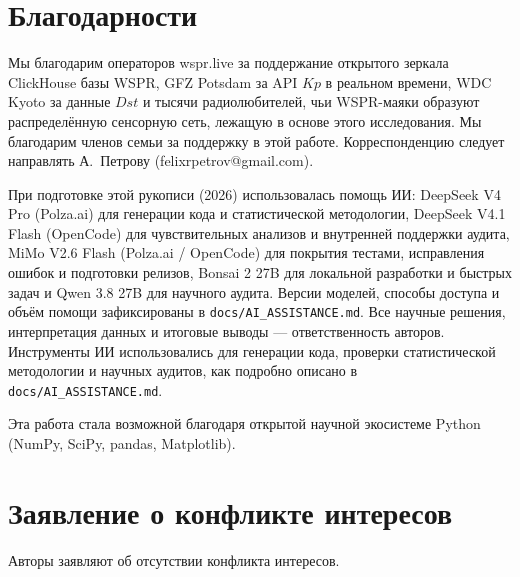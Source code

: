 \documentclass{agujournal2019}
\begin{document}
\section*{Благодарности}

Мы благодарим операторов wspr.live за поддержание открытого зеркала
ClickHouse базы WSPR, GFZ Potsdam за API $Kp$ в реальном времени,
WDC Kyoto за данные $Dst$ и тысячи радиолюбителей, чьи WSPR-маяки
образуют распределённую сенсорную сеть, лежащую в основе этого
исследования. Мы благодарим членов семьи за поддержку в этой работе.
Корреспонденцию следует направлять А.~Петрову (felixrpetrov@gmail.com).

При подготовке этой рукописи (2026) использовалась помощь ИИ:
DeepSeek V4 Pro (Polza.ai) для генерации кода и статистической методологии,
DeepSeek V4.1 Flash (OpenCode) для чувствительных анализов и внутренней
поддержки аудита, MiMo V2.6 Flash (Polza.ai / OpenCode) для покрытия
тестами, исправления ошибок и подготовки релизов, Bonsai 2 27B для
локальной разработки и быстрых задач и Qwen 3.8 27B для научного аудита.
Версии моделей, способы доступа и объём помощи зафиксированы в
\texttt{docs/AI\_ASSISTANCE.md}. Все научные решения, интерпретация
данных и итоговые выводы — ответственность авторов. Инструменты ИИ
использовались для генерации кода, проверки статистической методологии
и научных аудитов, как подробно описано в \texttt{docs/AI\_ASSISTANCE.md}.

Эта работа стала возможной благодаря открытой научной экосистеме Python
(NumPy, SciPy, pandas, Matplotlib).


\section*{Заявление о конфликте интересов}

Авторы заявляют об отсутствии конфликта интересов.




\end{document}
